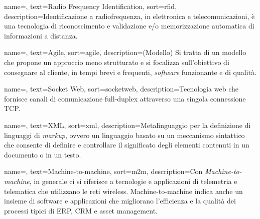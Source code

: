 {
    name=,
    text=Radio Frequency Identification,
    sort=rfid,
    description={Identificazione a radiofrequenza, in elettronica e telecomunicazioni, è una tecnologia di riconoscimento e validazione e/o memorizzazione automatica di informazioni a distanza.}
}

{
    name=,
    text=Agile,
    sort=agile,
    description={(Modello) Si tratta di un modello che propone un approccio meno strutturato e si focalizza sull’obiettivo di consegnare al cliente, in tempi brevi e frequenti, \emph{software} funzionante e di qualità.}
}

{
    name=,
    text=Socket Web,
    sort=socketweb,
    description={Tecnologia web che fornisce canali di comunicazione full-duplex attraverso una singola connessione TCP.}
}

{
    name=,
    text=XML,
    sort=xml,
    description={Metalinguaggio per la definizione di linguaggi di \emph{markup}, ovvero un linguaggio basato su un meccanismo sintattico 
    che consente di definire e controllare il significato degli elementi contenuti in un documento o in un testo.}
}

{
    name=,
    text=Machine-to-machine,
    sort=m2m,
    description={Con \emph{Machine-to-machine}, in generale ci si riferisce a tecnologie e applicazioni di telemetria e telematica che utilizzano le 
                reti wireless. Machine-to-machine indica anche un insieme di software e applicazioni che migliorano l'efficienza e la qualità dei 
                processi tipici di ERP, CRM e asset management.}
}
